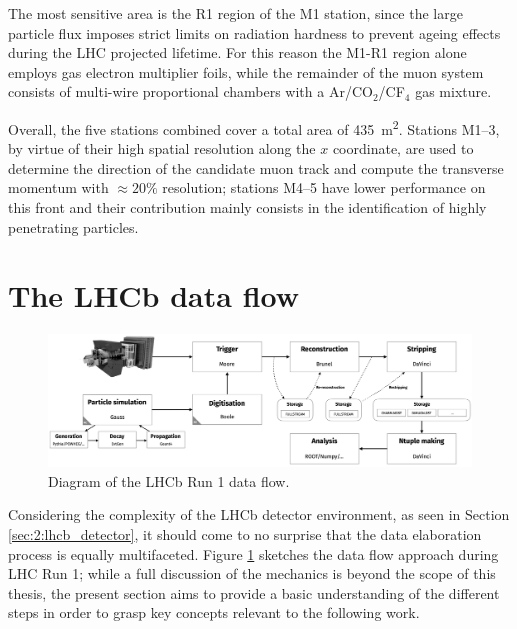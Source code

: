 The most sensitive area is the R1 region of the M1 station, since the large particle flux imposes strict limits on radiation hardness to prevent ageing effects during the LHC projected lifetime.
For this reason the M1-R1 region alone employs gas electron multiplier foils, while the remainder of the muon system consists of multi-wire proportional chambers with a Ar/CO$_2$/CF$_4$ gas mixture.

Overall, the five stations combined cover a total area of \SI{435}{\meter\squared}. Stations M1--3, by virtue of their high spatial resolution along the $x$ coordinate, are used to determine the direction of the candidate muon track and compute the transverse momentum with $\approx 20\%$ resolution;
stations M4--5 have lower performance on this front and their contribution mainly consists in the identification of highly penetrating particles.

\section{The LHCb data flow}
\label{sec:2:data_flow}

\begin{figure}[t]
	\centering
	\includegraphics[width=\textwidth]{graphics/02-lhcb/lhcb_run_1_data_flow.png}
	\caption{Diagram of the LHCb Run 1 data flow.}
	\label{fig:2:lhcb_data_flow}
\end{figure}

Considering the complexity of the LHCb detector environment, as seen in Section \ref{sec:2:lhcb_detector}, it should come to no surprise that the data elaboration process is equally multifaceted.
Figure \ref{fig:2:lhcb_data_flow} sketches the data flow approach during LHC Run 1;
while a full discussion of the mechanics is beyond the scope of this thesis, the present section aims to provide a basic understanding of the different steps in order to grasp key concepts relevant to the following work.

